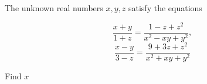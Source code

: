 The unknown real numbers $x, y, z$ satisfy the equations

\[
\dfrac{x+y}{1+z}=\dfrac{1-z+z^2}{x^2 - xy + y^2},
\]\[
\dfrac{x-y}{3-z}=\dfrac{9+3z+z^2}{x^2+xy+y^2}
\]

Find $x$
